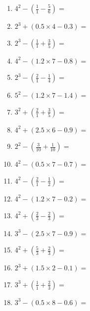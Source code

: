 \documentclass[12pt]{article}
\begin{document}
\begin{enumerate}
\item \large $ 4^{2} - (\frac{1}{1} - \frac{5}{6}) = $ \vspace{1.6cm}
\item \large $ 2^{3} + (0.5 \times 4 - 0.3) = $ \vspace{1.6cm}
\item \large $ 2^{3} - (\frac{1}{1} + \frac{3}{5}) = $ \vspace{1.6cm}
\item \large $ 4^{2} - (1.2 \times 7 - 0.8) = $ \vspace{1.6cm}
\newpage
\item \large $ 2^{3} - (\frac{2}{1} - \frac{1}{4}) = $ \vspace{1.6cm}
\item \large $ 5^{2} - (1.2 \times 7 - 1.4) = $ \vspace{1.6cm}
\item \large $ 3^{2} + (\frac{2}{1} + \frac{3}{5}) = $ \vspace{1.6cm}
\item \large $ 4^{2} + (2.5 \times 6 - 0.9) = $ \vspace{1.6cm}
\item \large $ 2^{2} - (\frac{3}{10} + \frac{1}{10}) = $ \vspace{1.6cm}
\item \large $ 4^{2} - (0.5 \times 7 - 0.7) = $ \vspace{1.6cm}
\item \large $ 4^{2} - (\frac{2}{1} - \frac{1}{2}) = $ \vspace{1.6cm}
\item \large $ 4^{2} - (1.2 \times 7 - 0.2) = $ \vspace{1.6cm}
\item \large $ 4^{2} + (\frac{2}{3} - \frac{2}{3}) = $ \vspace{1.6cm}
\item \large $ 3^{3} - (2.5 \times 7 - 0.9) = $ \vspace{1.6cm}
\newpage
\item \large $ 4^{2} + (\frac{5}{3} + \frac{2}{3}) = $ \vspace{1.6cm}
\item \large $ 2^{3} + (1.5 \times 2 - 0.1) = $ \vspace{1.6cm}
\item \large $ 3^{3} + (\frac{1}{1} + \frac{2}{3}) = $ \vspace{1.6cm}
\item \large $ 3^{3} - (0.5 \times 8 - 0.6) = $ \vspace{1.6cm}

\end{enumerate}
\end{document}
